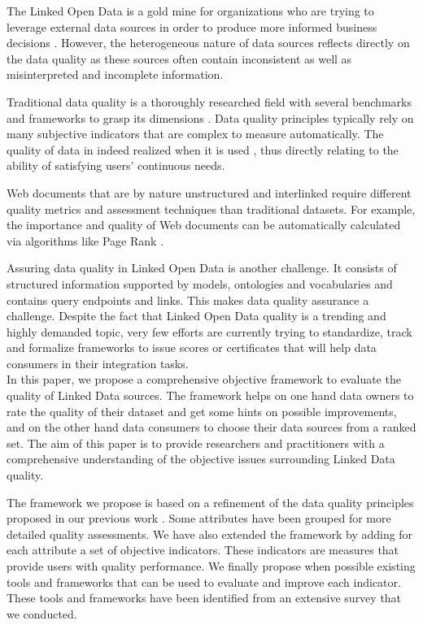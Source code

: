 \documentclass[onecolumn, crcready]{iosart2c}
\begin{document}
The Linked Open Data is a gold mine for organizations who are trying to leverage external data sources in order to produce more informed business decisions \cite{Boyd2011}. However, the heterogeneous nature of data sources reflects directly on the data quality as these sources often contain inconsistent as well as misinterpreted and incomplete information.

Traditional data quality is a thoroughly researched field with several benchmarks and frameworks to grasp its dimensions \cite{Kahn2002}\cite{Stvilia2007}\cite{Wang1996}. Data quality principles typically rely on many subjective indicators that are complex to measure automatically. The quality of data in indeed realized when it is used \cite{juran-j-1999-quality}, thus directly relating to the ability of satisfying users' continuous needs.

Web documents that are by nature unstructured and interlinked require different quality metrics and assessment techniques than traditional datasets. For example, the importance and quality of Web documents can be automatically calculated via algorithms like Page Rank \cite{ Lawrence981}.

Assuring data quality in Linked Open Data is another challenge. It consists of structured information supported by models, ontologies and vocabularies and contains query endpoints and links. This makes data quality assurance a challenge. Despite the fact that Linked Open Data quality is a trending and highly demanded topic, very few efforts are currently trying to standardize, track and formalize frameworks to issue scores or certificates that will help data consumers in their integration tasks.\\

In this paper, we propose a comprehensive objective framework to evaluate the quality of Linked Data sources. The framework helps on one hand data owners to rate the quality of their dataset and get some hints on possible improvements, and on the other hand data consumers to choose their data sources from a ranked set. The aim of this paper is to provide researchers and practitioners with a comprehensive understanding of the objective issues surrounding Linked Data quality.

The framework we propose is based on a refinement of the data quality principles proposed in our previous work \cite{assaf2012}. Some attributes have been grouped for more detailed quality assessments. We have also extended the framework by adding for each attribute a set of objective indicators. These indicators are measures that provide users with quality performance. We finally propose when possible existing tools and frameworks that can be used to evaluate and improve each indicator. These tools and frameworks have been identified from an extensive survey that we conducted.\\
\end{document}
